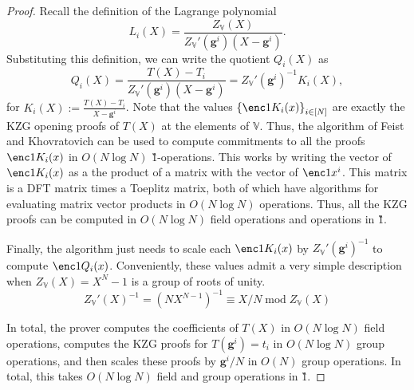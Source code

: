 \documentclass[11pt]{article} %
\newcommand{\defeq}{:=}
\newcommand{\sett}[2]{\ensuremath{\set{#1}_{#2}}\xspace}
\renewcommand{\mod}{\ensuremath{\;\mathrm{mod}\;}}
\newcommand{\set}[1]{\ensuremath{\left\{#1\right\}}\xspace}
\newcommand{\vgen}{\ensuremath{\mathbf{g}}\xspace}
\newcommand{\bigspace}{\ensuremath{\mathbb{V}}\xspace}
\newcommand{\tabsize}{\ensuremath{N}\xspace}
\newcommand{\tabruntime}{\ensuremath{\tabsize\log\tabsize}\xspace}
\begin{document}
\begin{proof} 
    Recall the definition of the Lagrange polynomial
    \[L_i(X) = \frac{Z_\bigspace(X)}{Z_\bigspace'(\vgen^i) (X - \vgen^i)}.\]
    Substituting this definition, we can write the quotient $Q_i(X)$ as 
    \[Q_i(X) = \frac{T(X) - T_i}{Z_\bigspace'(\vgen^i) (X - \vgen^i)} =
    Z_\bigspace'(\vgen^i)^{-1} K_i(X), \]
for $K_i(X)\defeq \frac{T(X)-T_i}{X-\vgen^i}$.
Note that the values \sett{\enc1{K_i(x)}}{i\in [\tabsize]} are exactly the KZG opening proofs of $T(X)$ at the
elements of \bigspace.
    Thus, the algorithm of Feist and Khovratovich \cite{fastkzgproofsorig, fastkzgproofs} 
    can be used to compute commitments to all the proofs $\enc1{K_i(x)}$ 
    in $O(\tabruntime)$ \G1-operations. This works by writing the vector of
    $\enc1{K_i(x)}$ as a the product of a matrix with the vector of
    $\enc1{x^i}$. This matrix is a DFT matrix times a Toeplitz matrix, both of
    which have algorithms for evaluating matrix vector products in
    $O(\tabruntime)$ operations. Thus, all the KZG proofs can be computed in
    $O(\tabruntime)$ field operations and operations in \G1.
    
    Finally, the algorithm just needs to scale each $\enc1{K_i(x)}$ by
    $Z_{\bigspace}'(\vgen^i)^{-1}$ to compute $\enc1{Q_i(x)}$. Conveniently, these
    values admit a very simple description when $Z_\bigspace(X) = X^\tabsize -
    1$ is a group of roots of unity.
    \[Z_\bigspace'(X)^{-1} = (\tabsize X^{\tabsize-1})^{-1} \equiv X / \tabsize \mod Z_\bigspace(X)\] 

    In total, the prover computes the coefficients of $T(X)$ in $O(\tabruntime)$
    field operations, computes the KZG proofs for $T(\vgen^i) = t_i$ in
    $O(\tabruntime)$ group operations, and then scales these proofs by $\vgen^i
    / N$ in $O(\tabsize)$ group operations. In total, this takes
    $O(\tabruntime)$ field and group operations in \G1.
\end{proof}
\end{document}
